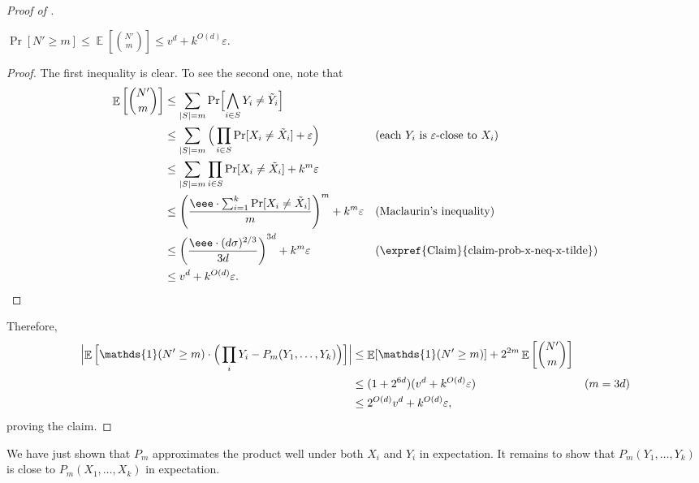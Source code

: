 \documentclass{toc}
\def\eps{\varepsilon}
\def\1{\mathds{1}}
\DeclarePairedDelimiter{\abs}{\lvert}{\rvert}
\DeclareMathOperator*{\E}{\mathbb{E}}                 %
\begin{document}
\begin{proof} [Proof of {}]
    \begin{claim} \label{claim-expect-of-binom}
      $\Pr[N' \ge m] \le \E \left[ {N' \choose m} \right] \le v^d + k^{O(d)} \eps$.
    \end{claim}

    \begin{proof} %
      The first inequality is clear.
      To see the second one, note that
      \begin{align*}
        \E \left[ {N' \choose m} \right]
        &\le \sum_{\abs{S} = m} \Pr\Bigl[ \bigwedge_{i \in S} Y_i \neq \tilde Y_i \Bigr] && \\
        &\le \sum_{\abs{S} = m} \Big( \prod_{i \in S} \Pr[ X_i \neq \tilde X_i ] + \eps \Big) && \text{(each $Y_i$ is $\eps$-close to $X_i$)} \\
        &\le \sum_{\abs{S} = m} \prod_{i \in S} \Pr[ X_i \neq \tilde X_i ] + k^m \eps &&\\
        &\le \left( \frac{\eee\cdot \sum_{i=1}^k \Pr[X_i \neq \tilde X_i] }{ m } \right)^m + k^m \eps &&  \text{(Maclaurin's inequality)} \\
        &\le \left( \frac{\eee\cdot (d \sigma)^{2/3} }{ 3d } \right)^{3d} + k^m \eps && \text{(\expref{Claim}{claim-prob-x-neq-x-tilde})}\\
        &\le v^d + k^{O(d)} \eps . &&  \qedhere
      \end{align*}
    \end{proof}
    Therefore,
    \begin{align*}
      \Bigl| \E \Big[\1(N' \ge m) \cdot \Big( \prod_i Y_i - P_m(Y_1, \ldots, Y_k) \Big) \Big] \Bigr|
      &\le \E[ \1(N' \ge m) ] + 2^{2m} \E \left[ \binom{N'}{m} \right] &&\\
      &\le (1 + 2^{6d}) ( v^d + k^{O(d)} \eps ) && (m = 3d) \\
      &\le 2^{O(d)} v^d + k^{O(d)} \eps , &&
    \end{align*}
    proving the claim.
  \end{proof}

  \medskip
  
  We have just shown that $P_m$ approximates the product well under both $X_i$ and $Y_i$ in expectation.
  It remains to show that $P_m(Y_1, \ldots, Y_k)$ is close to $P_m(X_1, \ldots, X_k)$ in expectation.
\end{document}
